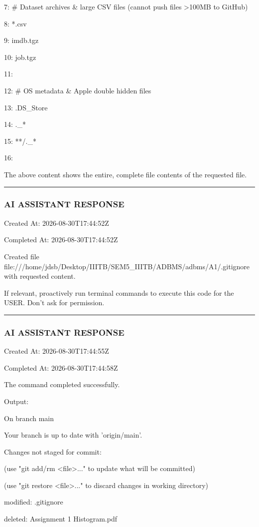 \documentclass[11pt,a4paper]{article}
\begin{document}
{7: \# Dataset archives \& large CSV files (cannot push files >100MB to GitHub)

8: *.csv

9: imdb.tgz

10: job.tgz

11:

12: \# OS metadata \& Apple double hidden files

13: .DS\_Store

14: .\_*

15: **/.\_*

16:

The above content shows the entire, complete file contents of the requested file.


\hrule

\subsubsection{AI ASSISTANT RESPONSE}

Created At: 2026-08-30T17:44:52Z

Completed At: 2026-08-30T17:44:52Z

Created file file:///home/jdsb/Desktop/IIITB/SEM5\_IIITB/ADBMS/adbms/A1/.gitignore with requested content.

If relevant, proactively run terminal commands to execute this code for the USER. Don't ask for permission.


\hrule

\subsubsection{AI ASSISTANT RESPONSE}

Created At: 2026-08-30T17:44:55Z

Completed At: 2026-08-30T17:44:58Z


The command completed successfully.

Output:

On branch main

Your branch is up to date with 'origin/main'.


Changes not staged for commit:

(use "git add/rm <file>..." to update what will be committed)

(use "git restore <file>..." to discard changes in working directory)

modified:   .gitignore

deleted:    Assignment 1 Histogram.pdf

}
\end{document}
